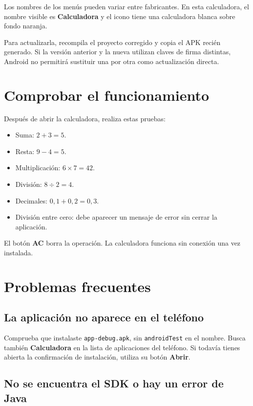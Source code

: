 \documentclass[12pt,a4paper]{article}
\begin{document}
Los nombres de los menús pueden variar entre fabricantes. En esta calculadora, el nombre visible es \textbf{Calculadora} y el icono tiene una calculadora blanca sobre fondo naranja.

Para actualizarla, recompila el proyecto corregido y copia el APK recién generado. Si la versión anterior y la nueva utilizan claves de firma distintas, Android no permitirá sustituir una por otra como actualización directa.

\section{Comprobar el funcionamiento}

Después de abrir la calculadora, realiza estas pruebas:

\begin{itemize}
    \item Suma: $2+3=5$.
    \item Resta: $9-4=5$.
    \item Multiplicación: $6\times7=42$.
    \item División: $8\div2=4$.
    \item Decimales: $0{,}1+0{,}2=0{,}3$.
    \item División entre cero: debe aparecer un mensaje de error sin cerrar la aplicación.
\end{itemize}

El botón \textbf{AC} borra la operación. La calculadora funciona sin conexión una vez instalada.

\section{Problemas frecuentes}

\subsection{La aplicación no aparece en el teléfono}

Comprueba que instalaste \texttt{app-debug.apk}, sin \texttt{androidTest} en el nombre. Busca también \textbf{Calculadora} en la lista de aplicaciones del teléfono. Si todavía tienes abierta la confirmación de instalación, utiliza su botón \textbf{Abrir}.

\subsection{No se encuentra el SDK o hay un error de Java}
\end{document}
